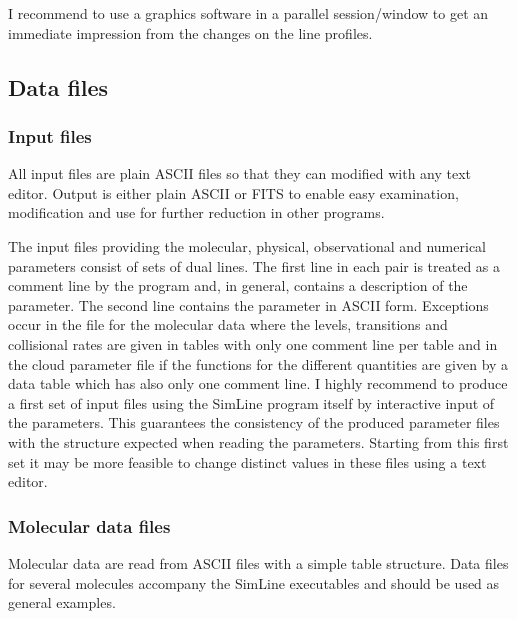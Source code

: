 I recommend to use a graphics software in a parallel session/window
to get an immediate impression from the changes on the line profiles. 

\subsection{Data files}
\label{datastruct}

\subsubsection{Input files}

All input files are plain ASCII files so that they can modified with 
any text editor. Output is either plain ASCII or FITS to enable
easy examination, modification and use for further reduction in other programs.

The input files providing the molecular, physical, observational and 
numerical parameters consist of sets of dual lines. The first line in each
pair is treated as a comment line by the program and, in general,
contains a description of the parameter. The second line
contains the parameter in ASCII form. Exceptions occur in the file
for the molecular data where the levels, transitions and collisional
rates are given in tables with only one comment line per table
and in the cloud parameter file if the functions for the different
quantities are given by a data table which has also only one comment line.
I highly recommend to produce a first set of input files
using the SimLine program itself by interactive input of the
parameters. This guarantees the consistency of the produced parameter 
files with the structure expected when reading the parameters.
Starting from this first set it may be more feasible to change
distinct values in these files using a text editor. 

\subsubsection{Molecular data files}

Molecular data are read from ASCII files with a simple table structure.
Data files for several molecules accompany the SimLine executables and should
be used as general examples. 

